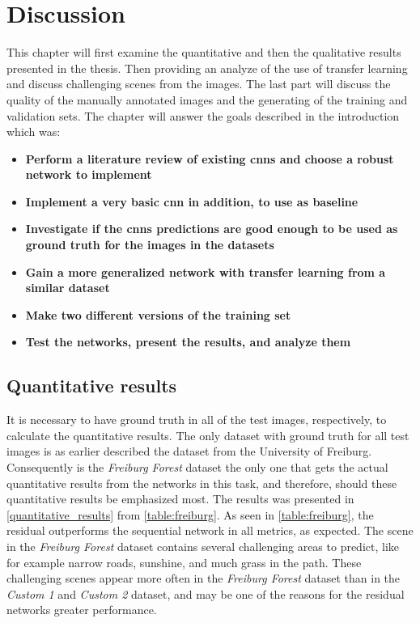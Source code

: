 \documentclass[USenglish]{ifimaster}  %
\begin{document}
\chapter{Discussion}\label{discussion}
This chapter will first examine the quantitative and then the qualitative results presented in the thesis. Then providing an analyze of the use of transfer learning and discuss challenging scenes from the images. The last part will discuss the quality of the manually annotated images and the generating of the training and validation sets. The chapter will answer the goals described in the introduction which was: 
\begin{itemize}
    \item \textbf{Perform a literature review of existing \acp{cnn} and choose a robust network to implement}
    \item \textbf{Implement a very basic \ac{cnn} in addition, to use as baseline}
    \item \textbf{Investigate if the \acp{cnn} predictions are good enough to be used as ground truth for the images in the datasets}
    \item \textbf{Gain a more generalized network with transfer learning from a similar dataset}
    \item \textbf{Make two different versions of the training set}
    \item \textbf{Test the networks, present the results, and analyze them}
\end{itemize}

\section{Quantitative results}
It is necessary to have ground truth in all of the test images, respectively, to calculate the quantitative results. The only dataset with ground truth for all test images is as earlier described the dataset from the University of Freiburg. Consequently is the \textit{Freiburg Forest} dataset the only one that gets the actual quantitative results from the networks in this task, and therefore, should these quantitative results be emphasized most. The results was presented in \cref{quantitative_results} from \cref{table:freiburg}. As seen in \cref{table:freiburg}, the residual outperforms the sequential network in all metrics, as expected. The scene in the \textit{Freiburg Forest} dataset contains several challenging areas to predict, like for example narrow roads, sunshine, and much grass in the path. These challenging scenes appear more often in the \textit{Freiburg Forest} dataset than in the \textit{Custom 1} and \textit{Custom 2} dataset, and may be one of the reasons for the residual networks greater performance. 
\end{document}
